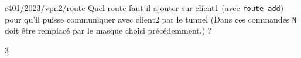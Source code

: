 \begin{question}{r401/2023/vpn2/route}
  Quel route faut-il ajouter sur client1 (avec {\tt route add}) pour
  qu'il puisse communiquer avec client2 par le tunnel (Dans ces
  commandes \texttt{N} doit être remplacé par le masque choisi
  précédemment.) ?
  \begin{multicols}{3}
    \begin{reponses}
      
      
      
      
      
      
    \end{reponses}
  \end{multicols}
\end{question}
